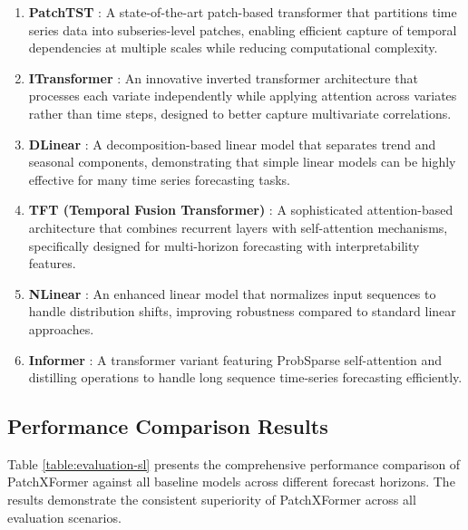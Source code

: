 \documentclass[12pt]{uomthesis}
\begin{document}
\begin{enumerate}
    \item \textbf{PatchTST} \cite{nie2022patchtst}: A state-of-the-art patch-based transformer that partitions time series data into subseries-level patches, enabling efficient capture of temporal dependencies at multiple scales while reducing computational complexity.

    \item \textbf{ITransformer} \cite{liu2023itransformer}: An innovative inverted transformer architecture that processes each variate independently while applying attention across variates rather than time steps, designed to better capture multivariate correlations.

    \item \textbf{DLinear} \cite{zeng2023transformers}: A decomposition-based linear model that separates trend and seasonal components, demonstrating that simple linear models can be highly effective for many time series forecasting tasks.

    \item \textbf{TFT (Temporal Fusion Transformer)} \cite{lim2021temporal}: A sophisticated attention-based architecture that combines recurrent layers with self-attention mechanisms, specifically designed for multi-horizon forecasting with interpretability features.

    \item \textbf{NLinear} \cite{zeng2023transformers}: An enhanced linear model that normalizes input sequences to handle distribution shifts, improving robustness compared to standard linear approaches.

    \item \textbf{Informer} \cite{zhou2021informer}: A transformer variant featuring ProbSparse self-attention and distilling operations to handle long sequence time-series forecasting efficiently.
\end{enumerate}

\subsection{Performance Comparison Results}

Table \ref{table:evaluation-sl} presents the comprehensive performance comparison of PatchXFormer against all baseline models across different forecast horizons. The results demonstrate the consistent superiority of PatchXFormer across all evaluation scenarios.
\end{document}
